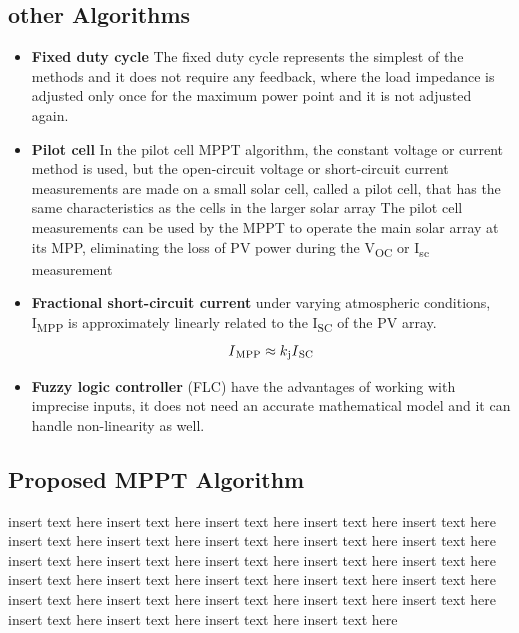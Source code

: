 \subsection{other Algorithms}
  \begin{itemize}
  \item {\bf Fixed duty cycle} The fixed duty cycle represents the simplest of the methods and it does not require any feedback, where the load impedance is adjusted only once for the maximum power point and it is not adjusted again.
  \item {\bf Pilot cell} In the pilot cell MPPT algorithm, the constant voltage or current method is used, but the open-circuit voltage or short-circuit current measurements are made on a small solar cell, called a pilot cell, that has the same characteristics as the cells in the larger solar array The pilot cell measurements can be used by the MPPT to operate the main solar array at its MPP, eliminating the loss of PV power during the V\textsubscript{OC} or I\textsubscript{sc} measurement
  \item {\bf Fractional short-circuit current }  under varying atmospheric conditions, I\textsubscript{MPP} is approximately linearly related to the I\textsubscript{SC} of the PV array. \newline
    \begin{equation}
      \begin{aligned}
    I\textsubscript{MPP} \approx k\textsubscript{j}I\textsubscript{SC}
    \label{eq:equ_fracoc}
    \end{aligned}
    \end{equation}
   \item {\bf Fuzzy logic controller} (FLC) have the advantages of working with imprecise inputs, it does not need an accurate mathematical model and it can handle non-linearity as well.
  \end{itemize} 
  
\subsection{Proposed MPPT Algorithm}
  insert text here insert text here insert text here insert text here insert text here
  insert text here insert text here insert text here insert text here insert text here insert text here insert text here insert text here insert text here insert text here insert text here insert text here insert text here insert text here insert text here insert text here insert text here insert text here insert text here insert text here insert text here insert text here insert text here insert text here   \\
  
